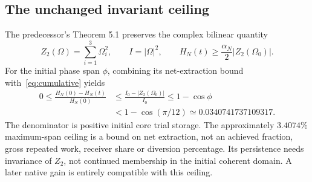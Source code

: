 \subsection{The unchanged invariant ceiling}\label{sec:capacity}
The predecessor's Theorem 5.1 preserves the complex bilinear quantity
\begin{equation}\label{eq:invariant}
Z_2(\Omega)=\sum_{i=1}^3\Omega_i^2,\qquad
I=|\Omega|^2,\qquad
H_N(t)\ge\frac{\alpha_N}{2}|Z_2(\Omega_0)|.
\end{equation}
For the initial phase span $\phi$, combining its net-extraction bound with~\eqref{eq:cumulative} yields
\begin{equation}\label{eq:capacity}
\begin{aligned}
0\le\frac{H_N(0)-H_N(t)}{H_N(0)}
&\le\frac{I_0-|Z_2(\Omega_0)|}{I_0}
\le1-\cos\phi\\
&<1-\cos(\pi/12)\simeq0.0340741737109317.
\end{aligned}
\end{equation}
The denominator is positive initial core trial storage. The approximately
$3.4074\%$ maximum-span ceiling is a bound on net extraction, not an achieved fraction, gross repeated work, receiver share or diversion percentage. Its persistence needs invariance of $Z_2$, not continued membership in the initial coherent domain. A later native gain is entirely compatible with this ceiling.
